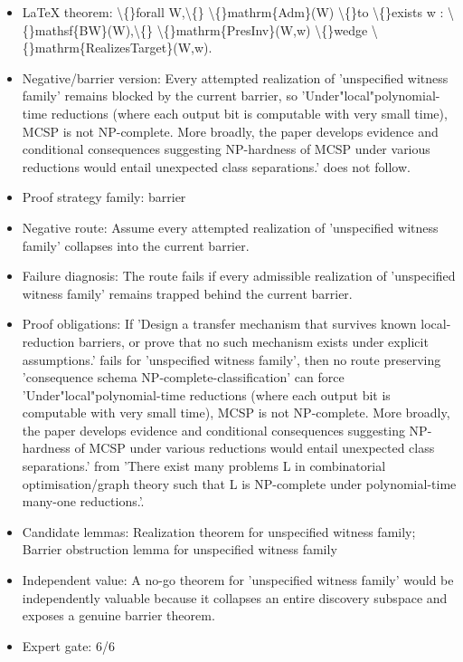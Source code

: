 \documentclass[11pt]{article}
\begin{document}
\begin{itemize}
\item LaTeX theorem: \textbackslash\{\}forall W,\textbackslash\{\} \textbackslash\{\}mathrm\{Adm\}(W) \textbackslash\{\}to \textbackslash\{\}exists w : \textbackslash\{\}mathsf\{BW\}(W),\textbackslash\{\} \textbackslash\{\}mathrm\{PresInv\}(W,w) \textbackslash\{\}wedge \textbackslash\{\}mathrm\{RealizesTarget\}(W,w).
\item Negative/barrier version: Every attempted realization of 'unspecified witness family' remains blocked by the current barrier, so 'Under"local"polynomial-time reductions (where each output bit is computable with very small time), MCSP is not NP-complete. More broadly, the paper develops evidence and conditional consequences suggesting NP-hardness of MCSP under various reductions would entail unexpected class separations.' does not follow.
\item Proof strategy family: barrier
\item Negative route: Assume every attempted realization of 'unspecified witness family' collapses into the current barrier.
\item Failure diagnosis: The route fails if every admissible realization of 'unspecified witness family' remains trapped behind the current barrier.
\item Proof obligations: If 'Design a transfer mechanism that survives known local-reduction barriers, or prove that no such mechanism exists under explicit assumptions.' fails for 'unspecified witness family', then no route preserving 'consequence schema NP-complete-classification' can force 'Under"local"polynomial-time reductions (where each output bit is computable with very small time), MCSP is not NP-complete. More broadly, the paper develops evidence and conditional consequences suggesting NP-hardness of MCSP under various reductions would entail unexpected class separations.' from 'There exist many problems L in combinatorial optimisation/graph theory such that L is NP-complete under polynomial-time many-one reductions.'.
\item Candidate lemmas: Realization theorem for unspecified witness family; Barrier obstruction lemma for unspecified witness family
\item Independent value: A no-go theorem for 'unspecified witness family' would be independently valuable because it collapses an entire discovery subspace and exposes a genuine barrier theorem.
\item Expert gate: 6/6
\end{itemize}
\end{document}
